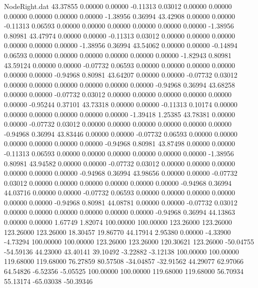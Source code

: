 \begin{filecontents}{NodeRight.dat}
  43.37855    0.00000    0.00000    -0.11313    0.03012    0.00000    0.00000    0.00000    0.00000    0.00000    0.00000   -1.38956    0.36994
  43.42908    0.00000    0.00000    -0.11313    0.06593    0.00000    0.00000    0.00000    0.00000    0.00000    0.00000   -1.38956    0.80981
  43.47974    0.00000    0.00000    -0.11313    0.03012    0.00000    0.00000    0.00000    0.00000    0.00000    0.00000   -1.38956    0.36994
  43.54062    0.00000    0.00000    -0.14894    0.06593    0.00000    0.00000    0.00000    0.00000    0.00000    0.00000   -1.82943    0.80981
  43.59124    0.00000    0.00000    -0.07732    0.06593    0.00000    0.00000    0.00000    0.00000    0.00000    0.00000   -0.94968    0.80981
  43.64207    0.00000    0.00000    -0.07732    0.03012    0.00000    0.00000    0.00000    0.00000    0.00000    0.00000   -0.94968    0.36994
  43.68258    0.00000    0.00000    -0.07732    0.03012    0.00000    0.00000    0.00000    0.00000    0.00000    0.00000   -0.95244    0.37101
  43.73318    0.00000    0.00000    -0.11313    0.10174    0.00000    0.00000    0.00000    0.00000    0.00000    0.00000   -1.39418    1.25385
  43.78381    0.00000    0.00000    -0.07732    0.03012    0.00000    0.00000    0.00000    0.00000    0.00000    0.00000   -0.94968    0.36994
  43.83446    0.00000    0.00000    -0.07732    0.06593    0.00000    0.00000    0.00000    0.00000    0.00000    0.00000   -0.94968    0.80981
  43.87498    0.00000    0.00000    -0.11313    0.06593    0.00000    0.00000    0.00000    0.00000    0.00000    0.00000   -1.38956    0.80981
  43.94582    0.00000    0.00000    -0.07732    0.03012    0.00000    0.00000    0.00000    0.00000    0.00000    0.00000   -0.94968    0.36994
  43.98656    0.00000    0.00000    -0.07732    0.03012    0.00000    0.00000    0.00000    0.00000    0.00000    0.00000   -0.94968    0.36994
  44.03716    0.00000    0.00000    -0.07732    0.06593    0.00000    0.00000    0.00000    0.00000    0.00000    0.00000   -0.94968    0.80981
  44.08781    0.00000    0.00000    -0.07732    0.03012    0.00000    0.00000    0.00000    0.00000    0.00000    0.00000   -0.94968    0.36994
  44.13863    0.00000    0.00000     1.67749    1.82074  100.00000  100.00000  123.26000  123.26000  123.26000  123.26000   18.30457   19.86770
  44.17914    2.95380    0.00000    -4.33900   -4.73294  100.00000  100.00000  123.26000  123.26000  120.30621  123.26000  -50.04755  -54.59136
  44.23000   43.40141   39.10492    -3.22882   -3.12138  100.00000  100.00000  119.68000  119.68000   76.27859   80.57508  -34.04857  -32.91562
  44.29077   62.97066   64.54826    -6.52356   -5.05525  100.00000  100.00000  119.68000  119.68000   56.70934   55.13174  -65.03038  -50.39346

\end{filecontents}
